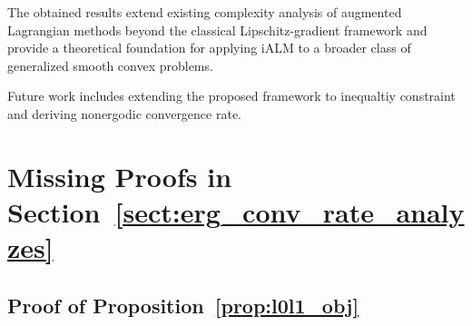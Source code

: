 \documentclass[runningheads]{llncs}
\begin{document}
	The obtained results extend existing complexity analysis of augmented Lagrangian methods beyond the classical Lipschitz-gradient framework and provide a theoretical foundation for applying iALM to a broader class of generalized smooth convex problems.
	
	Future work includes extending the proposed framework to inequaltiy constraint and deriving nonergodic convergence rate.
	
	
	
	
	
	\newpage
	
	\section{Missing Proofs in Section~\ref{sect:erg_conv_rate_analyzes}}
	
	\subsection{Proof of Proposition~\ref{prop:l0l1_obj}}\label{sect:ap:prop:l0l1_obj}
	
\end{document}
